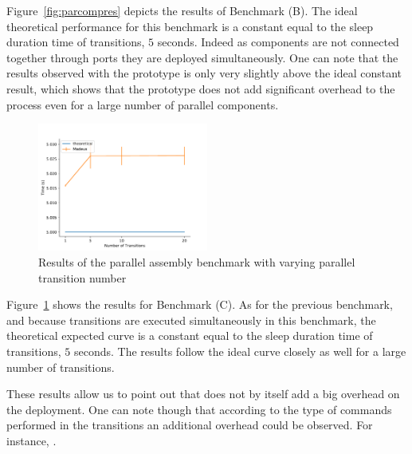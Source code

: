 Figure~\ref{fig:parcompres} depicts the results of Benchmark (B).  The
ideal theoretical performance for this benchmark is a constant equal
to the sleep duration time of transitions, \ie $5$ seconds. Indeed as
components are not connected together through ports they are deployed
simultaneously.
One can note that the results observed with the \mad prototype is only
very slightly above the ideal constant result, which shows that the
prototype does not add significant overhead to the process even for a
large number of parallel components.

\begin{figure}[h]
  \begin{center} 
    \includegraphics[width=0.5\textwidth]{./images/evaluations_par_transitions.pdf}
    \caption{Results of the parallel assembly benchmark with varying parallel transition number}
    \label{fig:partrans}
  \end{center}
\end{figure}

Figure~\ref{fig:partrans} shows the results for Benchmark (C). As for
the previous benchmark, and because transitions are executed
simultaneously in this benchmark, the theoretical expected curve is a
constant equal to the sleep duration time of transitions, \ie $5$
seconds. The results follow the ideal curve closely as well for a
large number of transitions.


These results allow us to point out that \mad does not by itself add a
big overhead on the deployment. One can note though that according to
the type of commands performed in the transitions  an additional
overhead could be observed. For instance, .


